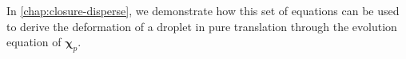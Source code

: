 \begin{enumerate}
\end{enumerate}
In \ref{chap:closure-disperse}, we demonstrate how this set of equations can be used to derive the deformation of a droplet in pure translation through the evolution equation of $\bm{\chi}_p$. 